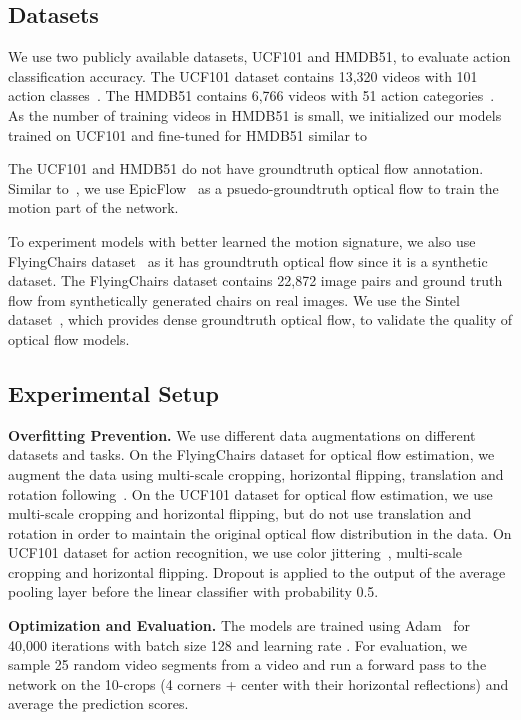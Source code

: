 \documentclass[10pt,twocolumn,letterpaper]{article}
\begin{document}
\subsection{Datasets}
We use two publicly available datasets, UCF101 and HMDB51, to evaluate action classification accuracy.
The UCF101 dataset contains 13,320 videos with 101 action classes~\cite{ucf101}.
The HMDB51 contains 6,766 videos with 51 action categories~\cite{kuehneHETT11}.
As the number of training videos in HMDB51 is small, we initialized our models trained on UCF101 and fine-tuned for HMDB51 similar to~\cite{simonyanZ14a}

The UCF101 and HMDB51 do not have groundtruth optical flow annotation.
Similar to~\cite{tranbftp16}, we use EpicFlow~\cite{ravaudWHS15} as a psuedo-groundtruth optical flow to train the motion part of the network.

To experiment models with better learned the motion signature, we also use FlyingChairs dataset~\cite{FischerDIHHGSCB15} as it has groundtruth optical flow since it is a synthetic dataset.
The FlyingChairs dataset contains 22,872 image pairs and ground truth flow from synthetically generated chairs on real images.
We use the Sintel dataset~\cite{butlerWSB12}, which provides dense groundtruth optical flow, to validate the quality of optical flow models.


\subsection{Experimental Setup}

\noindent \textbf{Overfitting Prevention.} We use different data augmentations on different datasets and tasks.
On the FlyingChairs dataset for optical flow estimation, we augment the data using multi-scale cropping, horizontal flipping, translation and rotation following~\cite{FischerDIHHGSCB15}.
On the UCF101 dataset for optical flow estimation, we use multi-scale cropping and horizontal flipping, but do not use translation and rotation in order to maintain the original optical flow distribution in the data.
On UCF101 dataset for action recognition, we use color jittering~\cite{szegedyLJSRAEVR15}, multi-scale cropping and horizontal flipping.
Dropout is applied to the output of the average pooling layer before the linear classifier with probability 0.5.

\noindent \textbf{Optimization and Evaluation.} The models are trained using Adam~\cite{kingmaB15} for 40,000 iterations with batch size 128 and learning rate .
For evaluation, we sample 25 random video segments from a video and run a forward pass to the network on the 10-crops (4 corners + center with their horizontal reflections) and average the prediction scores.
\end{document}
